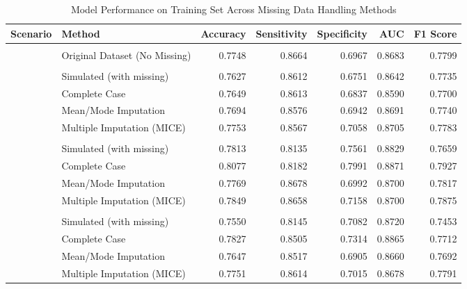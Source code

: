 \documentclass[
  letterpaper,
  DIV=11,
  numbers=noendperiod]{scrartcl}
\begin{document}
\begin{table}[H]
\centering
\caption{Model Performance on Training Set Across Missing Data Handling Methods}
\centering
\begin{tabular}[t]{llrrrrr}
\toprule
Scenario & Method & Accuracy & Sensitivity & Specificity & AUC & F1 Score\\
\midrule
\addlinespace[0.3em]
\multicolumn{7}{l}{\textbf{Full Dataset}}\\
\hspace{1em} & Original Dataset (No Missing) & 0.7748 & 0.8664 & 0.6967 & 0.8683 & 0.7799\\
\addlinespace[0.3em]
\multicolumn{7}{l}{\textbf{MCAR}}\\
\hspace{1em} & Simulated (with missing) & 0.7627 & 0.8612 & 0.6751 & 0.8642 & 0.7735\\
\hspace{1em} & Complete Case & 0.7649 & 0.8613 & 0.6837 & 0.8590 & 0.7700\\
\hspace{1em} & Mean/Mode Imputation & 0.7694 & 0.8576 & 0.6942 & 0.8691 & 0.7740\\
\hspace{1em} & Multiple Imputation (MICE) & 0.7753 & 0.8567 & 0.7058 & 0.8705 & 0.7783\\
\addlinespace[0.3em]
\multicolumn{7}{l}{\textbf{MAR}}\\
\hspace{1em} & Simulated (with missing) & 0.7813 & 0.8135 & 0.7561 & 0.8829 & 0.7659\\
\hspace{1em} & Complete Case & 0.8077 & 0.8182 & 0.7991 & 0.8871 & 0.7927\\
\hspace{1em} & Mean/Mode Imputation & 0.7769 & 0.8678 & 0.6992 & 0.8700 & 0.7817\\
\hspace{1em} & Multiple Imputation (MICE) & 0.7849 & 0.8658 & 0.7158 & 0.8700 & 0.7875\\
\addlinespace[0.3em]
\multicolumn{7}{l}{\textbf{MNAR}}\\
\hspace{1em} & Simulated (with missing) & 0.7550 & 0.8145 & 0.7082 & 0.8720 & 0.7453\\
\hspace{1em} & Complete Case & 0.7827 & 0.8505 & 0.7314 & 0.8865 & 0.7712\\
\hspace{1em} & Mean/Mode Imputation & 0.7647 & 0.8517 & 0.6905 & 0.8660 & 0.7692\\
\hspace{1em} & Multiple Imputation (MICE) & 0.7751 & 0.8614 & 0.7015 & 0.8678 & 0.7791\\
\bottomrule
\end{tabular}
\end{table}
\end{document}
